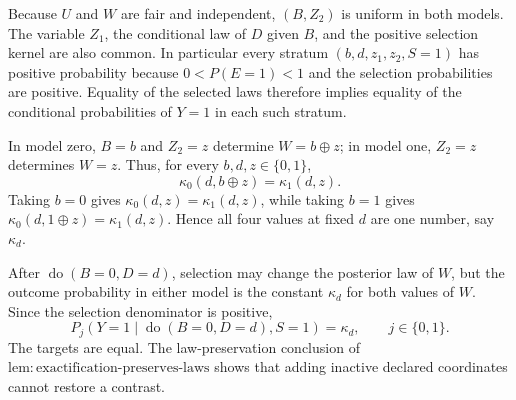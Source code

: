 Because \(U\) and \(W\) are fair and independent, \((B,Z_2)\) is uniform in both models. The variable \(Z_1\), the conditional law of \(D\) given \(B\), and the positive selection kernel are also common. In particular every stratum \((b,d,z_1,z_2,S=1)\) has positive probability because \(0<P(E=1)<1\) and the selection probabilities are positive. Equality of the selected laws therefore implies equality of the conditional probabilities of \(Y=1\) in each such stratum.

In model zero, \(B=b\) and \(Z_2=z\) determine \(W=b\oplus z\); in model one, \(Z_2=z\) determines \(W=z\). Thus, for every \(b,d,z\in\{0,1\}\),
\[
 \kappa_0(d,b\oplus z)=\kappa_1(d,z).
\]
Taking \(b=0\) gives \(\kappa_0(d,z)=\kappa_1(d,z)\), while taking \(b=1\) gives \(\kappa_0(d,1\oplus z)=\kappa_1(d,z)\). Hence all four values at fixed \(d\) are one number, say \(\kappa_d\).

After \(\operatorname{do}(B=0,D=d)\), selection may change the posterior law of \(W\), but the outcome probability in either model is the constant \(\kappa_d\) for both values of \(W\). Since the selection denominator is positive,
\[
 P_j(Y=1\mid\operatorname{do}(B=0,D=d),S=1)=\kappa_d,
 \qquad j\in\{0,1\}.
\]
The targets are equal. The law-preservation conclusion of \(\mathrm{lem:exactification\text{-}preserves\text{-}laws}\) shows that adding inactive declared coordinates cannot restore a contrast.